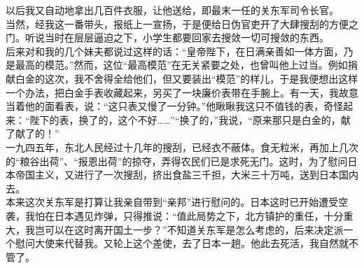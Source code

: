 以后我又自动地拿出几百件衣服，让他送给，即最末一任的关东军司令长官。\\

当然，经我这一番带头，报纸上一宣扬，于是便给日伪官吏开了大肆搜刮的方便之门。听说当时在层层逼迫之下，小学生都要回家去搜敛一切可搜敛的东西。\\

后来对和我的几个妹夫都说过这样的话：“皇帝陛下，在日满亲善如一体方面，乃是最高的模范。”然而，这位“最高模范”在无关紧要之处，也曾叫他上过当。例如捐献白金的这次，我不舍得全给他们，但又要装出“模范”的样儿，于是我便想出这样一个办法，把白金手表收藏起来，另买了一块廉价表带在手腕上。有一天，我故意当着他的面看表，说：“这只表又慢了一分钟。”他瞅瞅我这只不值钱的表，奇怪起来：“陛下的表，换了的，这个不好……”“换了的，”我说，“原来那只是白金的，献了献了的！”\\

一九四五年，东北人民经过十几年的搜刮，已经衣不蔽体。食无粒米，再加上几次的“粮谷出荷”、“报恩出荷”的掠夺，弄得农民们已是求死无门。这时，为了慰问日本帝国主义，又进行了一次搜刮，挤出食盐三千担，大米三十万吨，送到日本国内去。\\

本来这次关东军是打算让我亲自带到“亲邦”进行慰问的。日本这时已开始遭受空袭，我怕在日本遇见炸弹，只得推说：“值此局势之下，北方镇护的重任，十分重大，我岂可以在这时离开国土一步？”不知道关东军是怎么考虑的，后来决定派一个慰问大使来代替我。又轮上这个差使，去了日本一趟。他此去死活，我自然就不管了。
